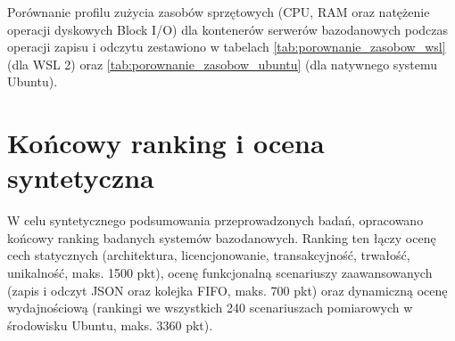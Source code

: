 Porównanie profilu zużycia zasobów sprzętowych (CPU, RAM oraz natężenie operacji dyskowych Block I/O) dla kontenerów serwerów bazodanowych podczas operacji zapisu i odczytu zestawiono w tabelach \ref{tab:porownanie_zasobow_wsl} (dla WSL 2) oraz \ref{tab:porownanie_zasobow_ubuntu} (dla natywnego systemu Ubuntu).




\section{Końcowy ranking i ocena syntetyczna}
\label{sec:ranking_koncowy}

W celu syntetycznego podsumowania przeprowadzonych badań, opracowano końcowy ranking badanych systemów bazodanowych. Ranking ten łączy ocenę cech statycznych (architektura, licencjonowanie, transakcyjność, trwałość, unikalność, maks. 1500 pkt), ocenę funkcjonalną scenariuszy zaawansowanych (zapis i odczyt JSON oraz kolejka FIFO, maks. 700 pkt) oraz dynamiczną ocenę wydajnościową (rankingi we wszystkich 240 scenariuszach pomiarowych w środowisku Ubuntu, maks. 3360 pkt).

